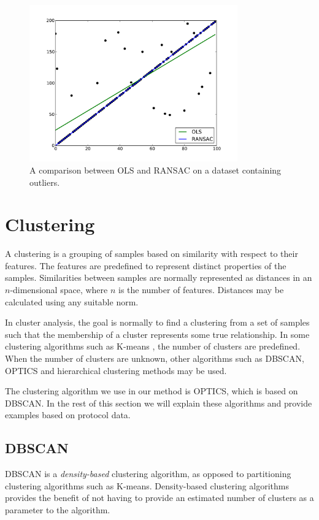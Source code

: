 \documentclass[a4paper]{report}
\begin{document}
\begin{figure}[t]
    \centering
    \includegraphics[width=0.8\textwidth]{ransac}
    \captionsetup{width=0.8\textwidth}
    \caption{A comparison between OLS and RANSAC on a dataset containing
    outliers.}
    \label{fig:ransac}
\end{figure}

\section{Clustering}
A clustering is a grouping of samples based on similarity with respect to their
features. The features are predefined to represent distinct properties of the
samples. Similarities between samples are normally represented as distances in
an $n$-dimensional space, where $n$ is the number of features. Distances may be
calculated using any suitable norm.

In cluster analysis, the goal is normally to find a clustering from a
set of samples such that the membership of a cluster represents some true
relationship. In some clustering algorithms such as K-means \citep{macqueen67},
the number of clusters are predefined. When the number of clusters are unknown,
other algorithms such as DBSCAN, OPTICS and hierarchical clustering methods may
be used.

The clustering algorithm we use in our method is OPTICS, which is based on
DBSCAN. In the rest of this section we will explain these algorithms and
provide examples based on protocol data.

\subsection{DBSCAN}
DBSCAN is a \emph{density-based} clustering algorithm, as opposed to
partitioning clustering algorithms such as K-means. Density-based clustering 
algorithms provides the benefit of not having to provide an estimated number 
of clusters as a parameter to the algorithm.
\end{document}

